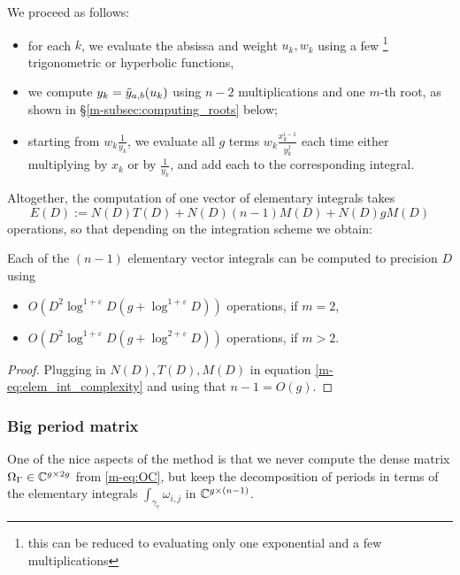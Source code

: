 \documentclass[main.tex]{subfiles}
\begin{document}
   We proceed as follows:
   \begin{itemize}
   \item for each $k$, we evaluate the absissa and weight $u_k,w_k$ using
       a few \footnote{this can be reduced to evaluating only one exponential
       and a few multiplications} trigonometric or hyperbolic functions,
   \item we compute $y_k=\tilde{y}_{a,b}(u_k)$ using $n-2$ multiplications and one $m$-th root,
       as shown in \S \ref{m-subsec:computing_roots} below;
   \item starting from $w_k\frac{1}{y_k}$, we evaluate all $g$ terms $w_k\frac{x_k^{i-1}}{y_k^j}$
       each time either multiplying by $x_k$ or by $\frac{1}{y_k}$, and add each to the corresponding
       integral.
   \end{itemize}

   Altogether, the computation of one vector of elementary integrals takes
   \begin{equation}\label{eq:elem_int_complexity}
    E(D) := N(D)T(D)+N(D)(n-1)M(D)+N(D)gM(D)
   \end{equation}
    operations,
   so that depending on the integration scheme we obtain:
   \begin{thm}\label{thm:complexity_integrals}
       Each of the $(n-1)$ elementary vector integrals can be computed to precision $D$ using
       \begin{itemize}
           \item $O(D^2\log^{1+\varepsilon} D (g + \log^{1+\varepsilon} D))$ operations, if $m=2$,
           \item $O(D^2\log^{1+\varepsilon} D (g + \log^{2+\varepsilon} D))$ operations, if $m>2$.
       \end{itemize}
   \end{thm}
   \begin{proof}
     Plugging in $N(D),T(D),M(D)$ in equation \eqref{m-eq:elem_int_complexity} and using that $n-1 = O(g)$.
   \end{proof}


   \subsubsection{Big period matrix}

   One of the nice aspects of the method is that we never compute
   the dense matrix $\Omega_{\Gamma}\in\mathbb{C}^{g\times 2g}$ from \eqref{m-eq:OC}, but
   keep the decomposition of periods in terms of the elementary integrals
   $\int_{\gamma_e}\omega_{i,j}$ in $\mathbb{C}^{g\times (n-1)}$.
\end{document}
